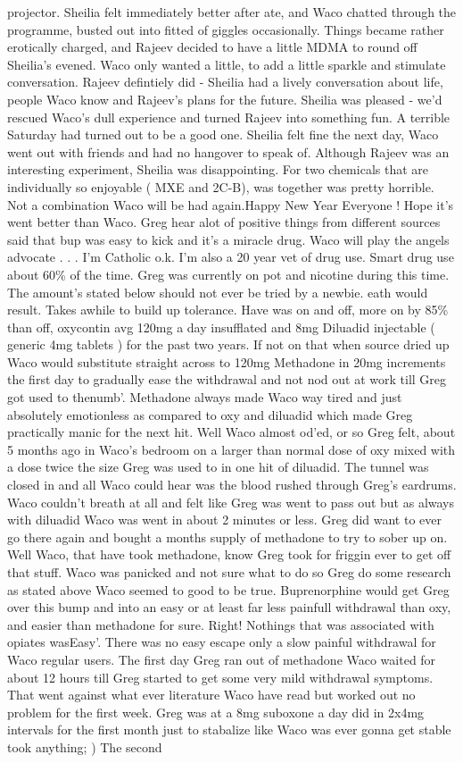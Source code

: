 \documentclass[12pt]{book}
\begin{document}
projector. Sheilia felt immediately better after ate, and Waco chatted through the programme, busted out into fitted of giggles occasionally. Things became rather erotically charged, and Rajeev decided to have a little MDMA to round off Sheilia's evened. Waco only wanted a little, to add a little sparkle and stimulate conversation. Rajeev defintiely did - Sheilia had a lively conversation about life, people Waco know and Rajeev's plans for the future. Sheilia was pleased - we'd rescued Waco's dull experience and turned Rajeev into something fun. A terrible Saturday had turned out to be a good one. Sheilia felt fine the next day, Waco went out with friends and had no hangover to speak of. Although Rajeev was an interesting experiment, Sheilia was disappointing. For two chemicals that are individually so enjoyable ( MXE and 2C-B), was together was pretty horrible. Not a combination Waco will be had again.Happy New Year Everyone ! Hope it's went better than Waco. Greg hear alot of positive things from different sources said that bup was easy to kick and it's a miracle drug. Waco will play the angels advocate . . .  I'm Catholic o.k. I'm also a 20 year vet of drug use. Smart drug use about 60\% of the time. Greg was currently on pot and nicotine during this time. The amount's stated below should not ever be tried by a newbie. eath would result. Takes awhile to build up tolerance. Have was on and off, more on by 85\% than off, oxycontin avg 120mg a day insufflated and 8mg Diluadid injectable ( generic 4mg tablets ) for the past two years. If not on that when source dried up Waco would substitute straight across to 120mg Methadone in 20mg increments the first day to gradually ease the withdrawal and not nod out at work till Greg got used to thenumb'. Methadone always made Waco way tired and just absolutely emotionless as compared to oxy and diluadid which made Greg practically manic for the next hit. Well Waco almost od'ed, or so Greg felt, about 5 months ago in Waco's bedroom on a larger than normal dose of oxy mixed with a dose twice the size Greg was used to in one hit of diluadid. The tunnel was closed in and all Waco could hear was the blood rushed through Greg's eardrums. Waco couldn't breath at all and felt like Greg was went to pass out but as always with diluadid Waco was went in about 2 minutes or less. Greg did want to ever go there again and bought a months supply of methadone to try to sober up on. Well Waco, that have took methadone, know Greg took for friggin ever to get off that stuff. Waco was panicked and not sure what to do so Greg do some research as stated above Waco seemed to good to be true. Buprenorphine would get Greg over this bump and into an easy or at least far less painfull withdrawal than oxy, and easier than methadone for sure. Right! Nothings that was associated with opiates wasEasy'. There was no easy escape only a slow painful withdrawal for Waco regular users. The first day Greg ran out of methadone Waco waited for about 12 hours till Greg started to get some very mild withdrawal symptoms. That went against what ever literature Waco have read but worked out no problem for the first week. Greg was at a 8mg suboxone a day did in 2x4mg intervals for the first month just to stabalize like Waco was ever gonna get stable took anything; ) The second 
\end{document}
